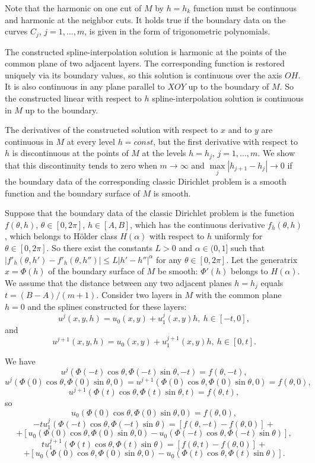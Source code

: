 \documentclass{amsart}
\begin{document}
Note that the harmonic on one cut of $M$ by $h=h_k$ function must be
continuous and harmonic at the neighbor cuts. It holds true if  the
boundary data on the curves $C_j$, $j=1,...,m$, is given in the form
of  trigonometric polynomials.

The constructed spline-interpolation solution is harmonic at the
points of the common plane of two adjacent layers. The corresponding
function is restored uniquely via its boundary values, so this
solution is continuous over the axis $OH$. It is also continuous in
any plane parallel to $XOY$ up to the boundary of $M$. So the
constructed linear with respect to $h$ spline-interpolation solution
is continuous in $M$ up to the boundary.

The derivatives of the constructed solution with respect to $x$ and
to $y$ are continuous in $M$ at every level $h=const$, but the first
derivative with respect to $h$ is discontinuous at the points of $M$
at the levels $h=h_j$, $j=1,...,m$. We show that this discontinuity
tends to zero when $m \to \infty$ and
$\max\limits_{j}|h_{j+1}-h_j|\to 0$ if the boundary data of the
corresponding classic Dirichlet problem is a smooth function and the
boundary surface of $M$ is smooth.

Suppose that the boundary data of the classic Dirichlet problem is
the function $f(\theta, h)$, $\theta\in [0,2\pi]$, $h\in [A,B]$,
which has the continuous derivative $f_h(\theta,h)$, which belongs
to H\"older class $H(\alpha)$ with respect to $h$ uniformly for
$\theta\in [0,2\pi]$. So there exist the constants $L>0$ and
$\alpha\in (0,1]$ such that $|f'_h(\theta,h')-f'_h(\theta,h'')|\leq
L |h'-h''|^\alpha$ for any $\theta\in [0,2\pi]$. Let the generatrix
$x=\Phi(h)$ of the boundary surface of $M$ be smooth: $\Phi'(h)$
belongs to $H(\alpha)$. We assume that the distance between any two
adjacent planes $h=h_j$ equals $t=(B-A)/(m+1)$. Consider two layers
in $M$ with the common plane $h=0$ and the splines constructed for
these layers:
$$
u^j(x,y,h)=u_0(x,y)+u^j_1(x,y) h, \   h\in [-t,0],
$$
and
$$
u^{j+1}(x,y,h)=u_0(x,y)+u^{j+1}_1(x,y) h, \    h\in [0,t].
$$

We have
$$
u^j(\Phi(-t)\cos\theta,\Phi(-t)\sin\theta,-t)=f(\theta,-t),
$$
$$
u^j(\Phi(0)\cos\theta,\Phi(0)\sin\theta,0)=
u^{j+1}(\Phi(0)\cos\theta,\Phi(0)\sin\theta,0)=f(\theta,0),
$$
$$
u^{j+1}(\Phi(t)\cos\theta,\Phi(t)\sin\theta,t)=f(\theta,t),
$$
so
$$
u_0(\Phi(0)\cos\theta,\Phi(0)\sin\theta,0)=f(\theta,0),
$$
$$
-t u^j_1(\Phi(-t)\cos\theta,\Phi(-t)\sin\theta)=
[f(\theta,-t)-f(\theta,0)]+
$$
$$
+[u_0(\Phi(0)\cos\theta,\Phi(0)\sin\theta,0)-
u_0(\Phi(-t)\cos\theta,\Phi(-t)\sin\theta)],
$$
$$
t u^{j+1}_1(\Phi(t)\cos\theta,\Phi(t)\sin\theta)=
[f(\theta,t)-f(\theta,0)]+
$$
$$
+[u_0(\Phi(0)\cos\theta,\Phi(0)\sin\theta,0)-
u_0(\Phi(t)\cos\theta,\Phi(t)\sin\theta)].
$$
\end{document}
